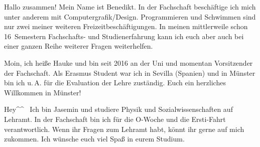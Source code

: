 \begin{multicols}{2}
{
Hallo zusammen! Mein Name ist Benedikt. In der Fachschaft beschäftige ich mich unter anderem mit Computergrafik/Design. 
Programmieren und Schwimmen sind nur zwei meiner weiteren Freizeitbeschäftigungen. 
In meinen mittlerweile schon 16~Semestern Fachschafts- und Studienerfahrung kann ich euch aber auch bei einer ganzen Reihe weiterer Fragen weiterhelfen.
}

\vspace{-0.5cm}

{
Moin, ich heiße Hauke und bin seit 2016 an der Uni und momentan Vorsitzender der Fachschaft. Als Erasmus Student war ich in Sevilla (Spanien) und in Münster bin ich u.\,A. für die Evaluation der Lehre zuständig. 
Euch ein herzliches Willkommen in Münster!
}

\vspace{0.2cm}

{
Hey\textasciicircum\textasciicircum~
Ich bin Jasemin und studiere Physik und Sozialwissenschaften auf Lehramt. In der Fachschaft bin ich für die O-Woche und die Ersti-Fahrt verantwortlich.
Wenn ihr Fragen zum Lehramt habt, könnt ihr gerne auf mich zukommen.
Ich wünsche euch viel Spaß in eurem Studium.
}

\vspace{-0.1cm}


\end{multicols}
